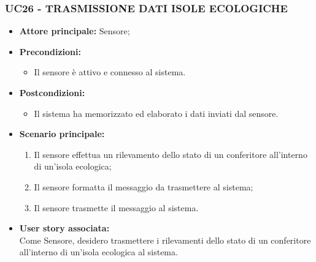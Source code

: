 \subsubsection{UC26 - TRASMISSIONE DATI ISOLE ECOLOGICHE}
\begin{itemize}
    \item \textbf{Attore principale:} Sensore;
    \item \textbf{Precondizioni:}
        \begin{itemize}
            \item Il sensore è attivo e connesso al sistema. 
        \end{itemize}
    \item \textbf{Postcondizioni:}
        \begin{itemize}
            \item Il sistema ha memorizzato ed elaborato i dati inviati dal sensore.
        \end{itemize}
    \item \textbf{Scenario principale:}
        \begin{enumerate}
            \item Il sensore effettua un rilevamento dello stato di un conferitore all'interno di un'isola ecologica;
            \item Il sensore formatta il messaggio da trasmettere al sistema;
            \item Il sensore trasmette il messaggio al sistema.
        \end{enumerate}
    \item \textbf{User story associata:} \\
    Come Sensore, desidero trasmettere i rilevamenti dello stato di un conferitore all'interno di un'isola ecologica al sistema.
\end{itemize}
